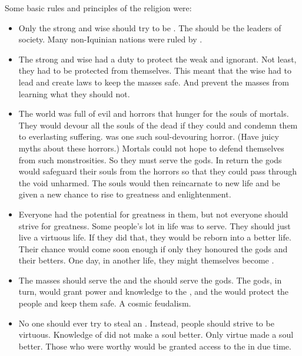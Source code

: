 Some basic rules and principles of the \Ortaican religion were:

\begin{itemize}
  \item 
    Only the strong and wise should try to be \rethyaxes.
    The \rethyaxes should be the leaders of society.
    Many non-Iquinian nations were ruled by \rethyaxes.
  \item 
    The strong and wise had a duty to protect the weak and ignorant.
    Not least, they had to be protected from themselves.
    This meant that the wise had to lead and create laws to keep the masses safe. 
    And prevent the masses from learning what they should not. 
  \item 
    The world was full of evil and horrors that hunger for the souls of mortals. 
    They would devour all the souls of the dead if they could and condemn them to everlasting suffering. 
    \Iquin was one such soul-devouring horror.
    (Have juicy myths about these horrors.)
    Mortals could not hope to defend themselves from such monstrosities.
    So they must serve the gods. 
    In return the gods would safeguard their souls from the horrors so that they could pass through the void unharmed. 
    The souls would then reincarnate to new life and be given a new chance to rise to greatness and enlightenment. 
  \item 
    Everyone had the potential for greatness in them, but not everyone should strive for greatness. 
    Some people's lot in life was to serve. 
    They should just live a virtuous life.
    If they did that, they would be reborn into a better life.
    Their chance would come soon enough if only they honoured the gods and their betters.
    One day, in another life, they might themselves become \rethyaxes. 
  \item 
    The masses should serve the \rethyaxes and the \rethyaxes should serve the gods.
    The gods, in turn, would grant power and knowledge to the \rethyaxes, and the \rethyaxes would protect the people and keep them safe. 
    A cosmic feudalism. 
  \item 
    No one should ever try to steal an \arcanum. 
    Instead, people should strive to be virtuous.
    Knowledge of \arcana did not make a soul better.
    Only virtue made a soul better. 
    Those who were worthy would be granted access to the \arcana in due time. 
\end{itemize}








